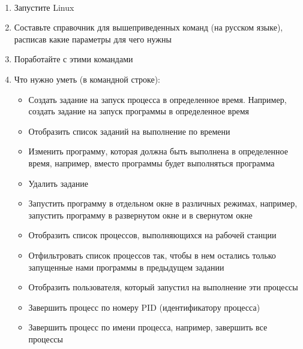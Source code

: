 \documentclass[a4paper,12pt]{article}
\begin{document}
    \begin{flushleft}
         \\[0.5em]
        \begin{enumerate}
            \item Запустите Linux
            \item Составьте справочник для вышеприведенных команд (на русском языке), расписав какие параметры для чего нужны
            \item Поработайте с этими командами
            \item Что нужно уметь (в командной строке):
            \begin{itemize}
                \item Создать задание на запуск процесса в определенное время. Например, создать задание на запуск программы  в определенное время
                \item Отобразить список заданий на выполнение по времени
                \item Изменить программу, которая должна быть выполнена в определенное время, например, вместо программы  будет выполняться программа 
                \item Удалить задание
                \item Запустить программу в отдельном окне в различных режимах, например, запустить программу  в развернутом окне и в свернутом окне
                \item Отобразить список процессов, выполняющихся на рабочей станции
                \item Отфильтровать список процессов так, чтобы в нем остались только запущенные нами программы  в предыдущем задании
                \item Отобразить пользователя, который запустил на выполнение эти процессы
                \item Завершить процесс по номеру PID (идентификатору процесса)
                \item Завершить процесс по имени процесса, например, завершить все процессы 
            \end{itemize}
        \end{enumerate}
    \end{flushleft}
\end{document}

